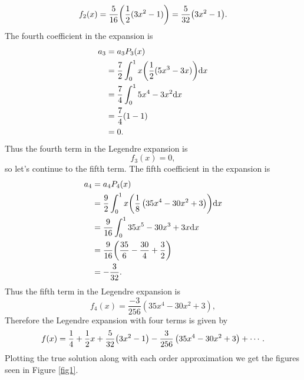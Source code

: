 \documentclass[12pt]{report}
\begin{document}
\begin{solution}
    \[
        f_2(x) = \frac{5}{16}{\left(\frac{1}{2}(3x^2 - 1)\right)} = \frac{5}{32}{\left(3x^2 -1\right)}.
    \]
    The fourth coefficient in the expansion is
    \begin{align*}
        a_3 &= a_3P_3(x)\\
        &= \frac{7}{2}\int_{0}^{1}x {\left(\frac{1}{2}(5x^3 -3x)\right)} {\mathrm{d}} x\\
        &= \frac{7}{4}\int_0^1 5x^4 - 3x^2 {\mathrm{d}} x\\
        &= \frac{7}{4}{\left(1 - 1\right)}\\
        &= 0.
    \end{align*}
    Thus the fourth term in the Legendre expansion is
    \[
        f_3(x) = 0,
    \]
    so let's continue to the fifth term.
    The fifth coefficient in the expansion is
    \begin{align*}
        a_4 &= a_4P_4(x)\\
        &= \frac{9}{2}\int_{0}^{1}x {\left( \frac{1}{8} \left(35 x^4-30 x^2+3\right)\right)} {\mathrm{d}} x\\
        &= \frac{9}{16}\int_0^1 35x^5 - 30x^3 + 3x{\mathrm{d}} x\\
        &= \frac{9}{16}{\left(\frac{35}{6} - \frac{30}{4} + \frac{3}{2}\right)}\\
        &= -\frac{3}{32}.
    \end{align*}
    Thus the fifth term in the Legendre expansion is
    \[
        f_4(x) = \frac{-3}{256}  \left(35 x^4-30 x^2+3\right),
    \]
    Therefore the Legendre expansion with four terms is given by
    \[
        f(x) = \frac{1}{4} + \frac{1}{2} x + \frac{5}{32}{\left(3x^2 -1\right)} - \frac{3}{256}  \left(35 x^4-30 x^2+3\right) + \cdots.
    \]
    Plotting the true solution along with each order approximation we get the figures seen in Figure \ref{fig1}.


\end{solution}
\end{document}
